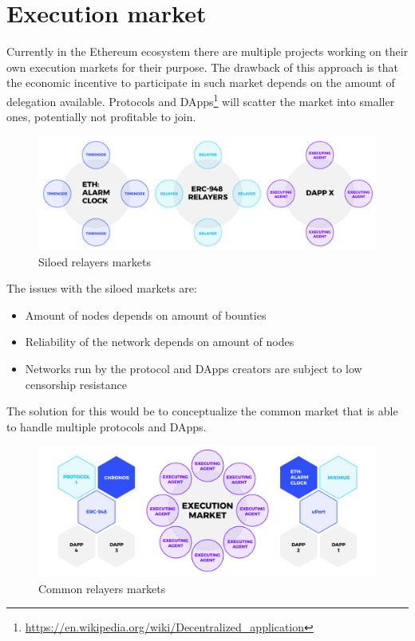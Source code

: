 \documentclass{report}
\begin{document}
  \section{Execution market}

  Currently in the Ethereum ecosystem there are multiple projects working on their own execution markets for their purpose. The drawback of this approach is that the economic incentive to participate in such market depends on the amount of delegation available. Protocols and DApps\footnote{\url{https://en.wikipedia.org/wiki/Decentralized_application}} will scatter the market into smaller ones, potentially not profitable to join.

  \begin{figure}[h]
    \includegraphics[width=\textwidth]{silos}
    \caption{Siloed relayers markets}
  \end{figure}

  The issues with the siloed markets are:
  \begin{itemize}
    \item Amount of nodes depends on amount of bounties
    \item Reliability of the network depends on amount of nodes
    \item Networks run by the protocol and DApps creators are subject to low censorship resistance
  \end{itemize}

  The solution for this would be to conceptualize the common market that is able to handle multiple protocols and DApps.

  \begin{figure}[h]
    \includegraphics[width=\textwidth]{comon}
    \caption{Common relayers markets}
  \end{figure}
\end{document}
